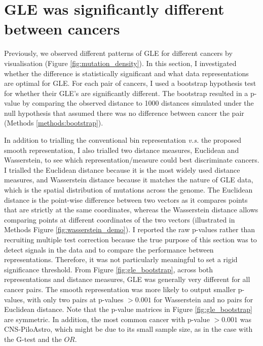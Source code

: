 

\section{GLE was significantly different between cancers}\label{gle:bootstrap}
Previously, we observed different patterns of GLE for different cancers by visualisation (Figure \ref{fig:mutation_density}). In this section, I investigated whether the difference is statistically significant and what data representations are optimal for GLE. For each pair of cancers, I used a bootstrap hypothesis test for whether their GLE's are significantly different. The bootstrap resulted in a p-value by comparing the observed distance to 1000 distances simulated under the null hypothesis that assumed there was no difference between cancer the pair (Methods \ref{methods:bootstrap}).

In addition to trialling the conventional bin representation \textit{v.s.} the proposed smooth representation, I also trialled two distance measures, Euclidean and Wasserstein, to see which representation/measure could best discriminate cancers. I trialled the Euclidean distance because it is the most widely used distance measures, and Wasserstein distance because it matches the nature of GLE data, which is the spatial distribution of mutations across the genome. The Euclidean distance is the point-wise difference between two vectors as it compares points that are strictly at the same coordinates, whereas the Wasserstein distance allows comparing points at different coordinates of the two vectors (illustrated in Methods Figure \ref{fig:wasserstein_demo}). I reported the raw p-values rather than recruiting multiple test correction because the true purpose of this section was to detect signals in the data and to compare the performance between representations. Therefore, it was not particularly meaningful to set a rigid significance threshold. From Figure \ref{fig:gle_bootstrap}, across both representations and distance measures, GLE was generally very different for all cancer pairs. The smooth representation was more likely to output smaller p-values, with only two pairs at p-values $>0.001$ for Wasserstein and no pairs for Euclidean distance. Note that the p-value matrices in Figure \ref{fig:gle_bootstrap} are symmetric. In addition, the most common cancer with p-value $>0.001$ was CNS-PiloAstro, which might be due to its small sample size, as in the case with the G-test and the $OR$. 

